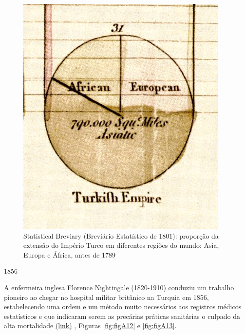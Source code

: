 \documentclass[
]{book}
\begin{document}
\begin{figure}

{\centering \includegraphics[width=1\linewidth]{images1/playfair-piechart-1801} 

}

\caption{Statistical Breviary (Breviário Estatístico de 1801): proporção da extensão do Império Turco em diferentes regiões do mundo: Asia, Europa e África, antes de 1789}\label{fig:figA11}
\end{figure}

\hfill\break

1856

\hfill\break

A enfermeira inglesa Florence Nightingale (1820-1910) conduziu um trabalho pioneiro ao chegar no hospital militar britânico na Turquia em 1856, estabelecendo uma ordem e um método muito necessários aos registros médicos estatísticos e que indicaram serem as precárias práticas sanitárias o culpado da alta mortalidade \href{https://www.york.ac.uk/depts/maths/histstat/small.htm}{(link)} , Figuras \ref{fig:figA12} e \ref{fig:figA13}.

\hfill\break
\end{document}
